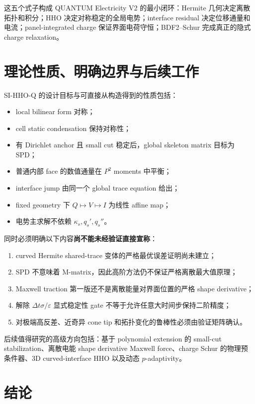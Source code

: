 \documentclass[UTF8,a4paper,11pt]{ctexart}
\newcommand{\eps}{\varepsilon}
\begin{document}
这五个式子构成 QUANTUM Electricity V2 的最小闭环：Hermite 几何决定离散拓扑和积分；HHO 决定对称稳定的全局电势；interface residual 决定位移通量和电流；panel-integrated charge 保证界面电荷守恒；BDF2--Schur 完成真正的隐式 charge relaxation。

\section{理论性质、明确边界与后续工作}

SI-HHO-Q 的设计目标与可直接从构造得到的性质包括：
\begin{itemize}
  \item local bilinear form 对称；
  \item cell static condensation 保持对称性；
  \item 有 Dirichlet anchor 且 small cut 稳定后，global skeleton matrix 目标为 SPD；
  \item 普通内部 face 的数值通量在 \(P^2\) moments 中平衡；
  \item interface jump 由同一个 global trace equation 给出；
  \item fixed geometry 下 \(Q\mapsto V\mapsto I\) 为线性 affine map；
  \item 电势主求解不依赖 \(\kappa_s,q_s',q_s''\)。
\end{itemize}

同时必须明确以下内容\textbf{尚不能未经验证直接宣称}：
\begin{enumerate}[label=\arabic*)]
  \item curved Hermite shared-trace 变体的严格最优误差证明尚未建立；
  \item SPD 不意味着 M-matrix，因此高阶方法仍不保证严格离散最大值原理；
  \item Maxwell traction 第一版还不是离散能量对界面位置的严格 shape derivative；
  \item 解除 \(\Delta t\sigma/\eps\) 显式稳定性 gate 不等于允许任意大时间步保持二阶精度；
  \item 对极端高反差、近奇异 cone tip 和拓扑变化的鲁棒性必须由验证矩阵确认。
\end{enumerate}

后续值得研究的高级方向包括：基于 polynomial extension 的 small-cut stabilization\cite{BurmanErnMottier2026}、离散电能 shape derivative Maxwell force、charge Schur 的物理预条件器、3D curved-interface HHO 以及动态 \(p\)-adaptivity。

\section*{结论}
\end{document}
